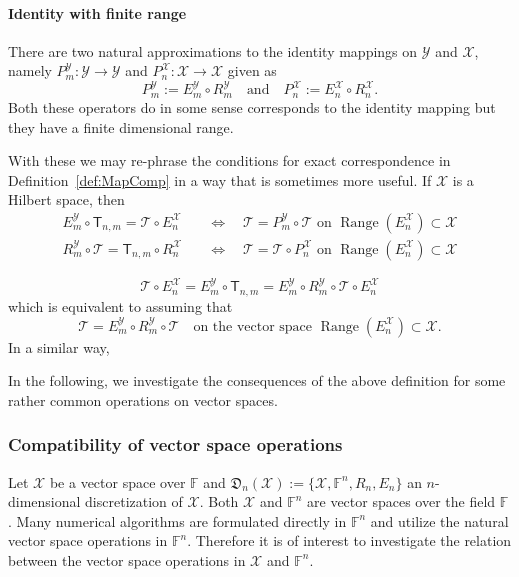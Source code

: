 \documentclass[a4paper]{paper}
\newcommand{\discr}{\mathfrak{D}}
\newcommand{\VecSpace}[1]{\mathscr{#1}}
\newcommand{\Field}{\mathbb{F}}
\newcommand{\Op}[1]{\mathcal{#1}}
\newcommand{\DiscOp}[1]{\mathsf{#1}}
\DeclareMathOperator{\range}{Range}
\begin{document}
\paragraph{Identity with finite range}
There are two natural approximations to the identity mappings on $\VecSpace{Y}$ and $\VecSpace{X}$, 
namely $P^{\VecSpace{Y}}_{m} \colon \VecSpace{Y} \to \VecSpace{Y}$ and 
$P^{\VecSpace{X}}_{n}\colon \VecSpace{X} \to \VecSpace{X}$ given as 
\[  P^{\VecSpace{Y}}_{m} := E^{\VecSpace{Y}}_{m} \circ R^{\VecSpace{Y}}_{m}
   \quad\text{and}\quad
   P^{\VecSpace{X}}_{n} := E^{\VecSpace{X}}_{n} \circ R^{\VecSpace{X}}_{n}.
\]   
Both these operators do in some sense corresponds to the identity mapping but they have a finite dimensional range.

With these we may re-phrase the conditions for exact correspondence in Definition~\ref{def:MapComp}
in a way that is sometimes more useful. If $\VecSpace{X}$ is a Hilbert space, then
\begin{align*}
  E^{\VecSpace{Y}}_{m} \circ \DiscOp{T}_{n,m} = \Op{T} \circ E_{n}^{\VecSpace{X}}
    &\quad\iff\quad
    \Op{T} = P^{\VecSpace{Y}}_{m} \circ \Op{T}
    \text{ on $\range(E^{\VecSpace{X}}_{n}) \subset \VecSpace{X}$} \\
 R^{\VecSpace{Y}}_{m} \circ \Op{T} = \DiscOp{T}_{n,m} \circ R^{\VecSpace{X}}_{n}
    &\quad\iff\quad
    \Op{T} = \Op{T} \circ P^{\VecSpace{X}}_{n}
    \text{ on $\range(E^{\VecSpace{X}}_{n}) \subset \VecSpace{X}$}     
\end{align*}

\[  \Op{T} \circ E_{n}^{\VecSpace{X}} = E^{\VecSpace{Y}}_{m} \circ \DiscOp{T}_{n,m} 
      = E^{\VecSpace{Y}}_{m} \circ R^{\VecSpace{Y}}_{m} \circ \Op{T} \circ E^{\VecSpace{X}}_{n}
\]
which is equivalent to assuming that 
\[  \Op{T} = E^{\VecSpace{Y}}_{m} \circ R^{\VecSpace{Y}}_{m} \circ \Op{T}
     \quad\text{on the vector space $\range(E^{\VecSpace{X}}_{n}) \subset \VecSpace{X}$.} 
\]
In a similar way, 

In the following, we investigate the consequences of the above definition for some rather common operations
on vector spaces.





\subsubsection{Compatibility of vector space operations}
Let $\VecSpace{X}$ be a vector space over $\Field$ and 
$\discr_{n}(\VecSpace{X}):=\{\VecSpace{X},\Field^{n},R_{n},E_{n}\}$ an $n$-dimensional discretization of 
$\VecSpace{X}$.  Both $\VecSpace{X}$ and $\Field^{n}$ are vector spaces over the field $\Field$. 
Many numerical algorithms are 
formulated directly in $\Field^{n}$ and utilize the natural vector space operations in $\Field^{n}$. Therefore it is of
interest to investigate the relation between the vector space operations in $\VecSpace{X}$ and $\Field^{n}$.
\end{document}
